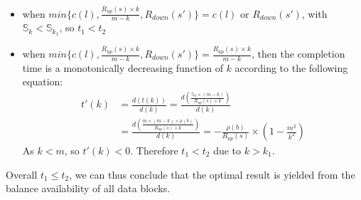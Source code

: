 \begin{itemize}
\item when $min\{c(l),\frac{R_{up}(s)\times k}{m-k},R_{down}(s')\} = c(l)$ or $R_{down}(s')$, with $\mathbb{S}_k<\mathbb{S}_{k_1}$, so $t_1<t_2$
    
\item when $min\{c(l),\frac{R_{up}(s)\times k}{m-k},R_{down}(s')\} = \frac{R_{up}(s)\times k}{m-k}$, then the completion time is a monotonically decreasing function of $k$ according to the following equation:
\begin{equation}
\label{calculus}
\begin{split}
t'(k) &= \frac{d(t(k))}{d(k)} = \frac{d(\frac{\mathbb{S}_k\times (m-k)}{R_{up}(s)\times k})}{d(k)} \\
    &= \frac{d(\frac{m\times (m-k)\times \rho(b)}{R_{up}(s)\times k})}{d(k)} = -\frac{\rho(b)}{R_{up}(s)} \times (1-\frac{m^2}{k^2})
\end{split}
\end{equation}
As $k<m$, so $t'(k)<0$. Therefore $t_1<t_2$ due to $k>k_1$.
\end{itemize}


Overall $t_1\leq t_2$, we can thus conclude that the optimal result is yielded from the balance availability of all data blocks.

%
%

